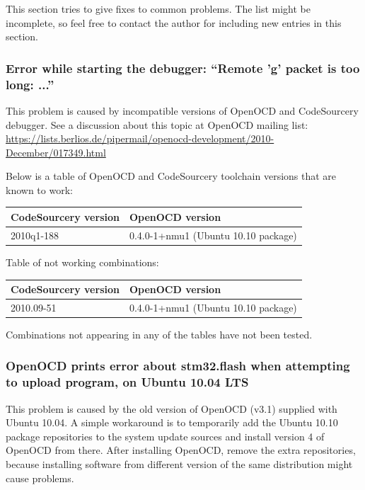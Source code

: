 \documentclass[a4paper, 10pt]{article}
\begin{document}
This section tries to give fixes to common problems.
The list might be incomplete, so feel free to contact the author for including
new entries in this section.

\subsubsection{Error while starting the debugger: ``Remote 'g' packet is too long: ...''}

\label{sect:gdb-problems}
This problem is caused by incompatible versions of OpenOCD and CodeSourcery debugger.
See a discussion about this topic at OpenOCD mailing list:
\url{https://lists.berlios.de/pipermail/openocd-development/2010-December/017349.html}

Below is a table of OpenOCD and CodeSourcery toolchain versions that are known to work:

    \smallskip
    \begin{tabular}{ l | l }
    CodeSourcery version & OpenOCD version \\
    \hline
    2010q1-188          &   0.4.0-1+nmu1 (Ubuntu 10.10 package) \\
    \end{tabular}
    \smallskip

Table of not working combinations:

    \smallskip
    \begin{tabular}{ l | l }
    CodeSourcery version & OpenOCD version \\
    \hline
    2010.09-51          &   0.4.0-1+nmu1 (Ubuntu 10.10 package) \\
    \end{tabular}
    \smallskip

Combinations not appearing in any of the tables have not been tested.

\subsubsection{OpenOCD prints error about stm32.flash
    when attempting to upload program,
    on Ubuntu 10.04 LTS}

This problem is caused by the old version of OpenOCD (v3.1)
supplied with Ubuntu 10.04.
A simple workaround is to temporarily add the Ubuntu 10.10 package repositories
to the system update sources and install version 4 of OpenOCD from there.
After installing OpenOCD, remove the extra repositories,
because installing software from different version of the same distribution
might cause problems.
\end{document}
